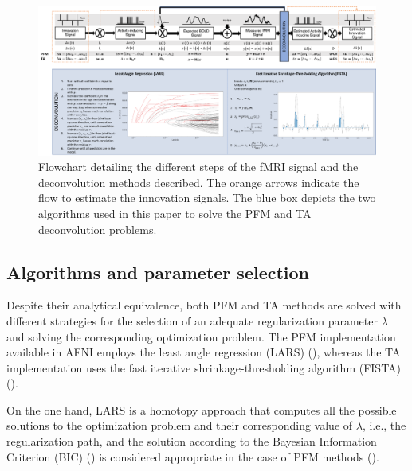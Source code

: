 \begin{figure}[t!]
    \begin{center}
        \includegraphics[width=\columnwidth]{figures/flowchart.pdf}
    \end{center}
    \caption{Flowchart detailing the different steps of the fMRI signal and the deconvolution methods described. The orange arrows indicate the flow to estimate the innovation signals. The blue box depicts the two algorithms used in this paper to solve the PFM and TA deconvolution problems.}
\label{fig:flowchart}
\end{figure}

\subsection{Algorithms and parameter selection}
\label{sec:regparam}
Despite their analytical equivalence, both PFM and TA methods are solved with different strategies for the selection of an adequate regularization parameter $\lambda$ and solving the corresponding optimization problem. The PFM implementation available in AFNI employs the least angle regression (LARS) (\citealt{Efron2004Leastangleregression}), whereas the TA implementation uses the fast iterative shrinkage-thresholding algorithm (FISTA) (\citealt{Beck2009FastIterativeShrinkage}). 

On the one hand, LARS is a homotopy approach that computes all the possible solutions to the optimization problem and their corresponding value of $\lambda$, i.e., the regularization path, and the solution according to the Bayesian Information Criterion (BIC) (\citealt{Schwarz1978EstimatingDimensionModel}) is considered appropriate in the case of PFM methods (\citealt{Gaudes2013Paradigmfreemapping,CaballeroGaudes2019deconvolutionalgorithmmulti}). 

